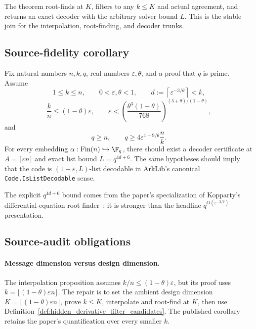 The theorem root-finds at $K$, filters to any $k\le K$ and actual agreement, and returns an exact
decoder with the arbitrary solver bound $L$.  This is the stable join for the interpolation,
root-finding, and decoder trunks.

\subsection{Source-fidelity corollary}

Fix natural numbers $n,k,q$, real numbers $\varepsilon,\theta$, and a proof that $q$ is prime.
Assume
\[
  1\le k\le n,\qquad 0<\varepsilon,\theta<1,
  \qquad d:=\left\lceil\varepsilon^{-3/\theta}\right\rceil<k,
\]
\[
  \frac{k}{n}\le(1-\theta)\varepsilon,
  \qquad
  \varepsilon<
    \left(\frac{\theta^3(1-\theta)}{768}\right)^{(5+\theta)/(1-\theta)},
\]
and
\[
  q\ge n,
  \qquad
  q\ge 4\varepsilon^{1-9/\theta}\frac{n}{k}.
\]
For every embedding $\alpha:\operatorname{Fin}(n)\hookrightarrow\F_q$, there should exist a
decoder certificate at $A=\lceil\varepsilon n\rceil$ and exact list bound $L=q^{4d+6}$.  The same
hypotheses should imply that the code is $(1-\varepsilon,L)$-list decodable in ArkLib's canonical
\texttt{Code.IsListDecodable} sense.

\begin{theorem}
  \label{thm:low_rate_rs_list_decoding}
  \notready
\end{theorem}

The explicit $q^{4d+6}$ bound comes from the paper's specialization of Kopparty's
differential-equation root finder~\cite[Theorem~4.3]{Kop15}; it is stronger than the headline
$q^{O(\varepsilon^{-3/\theta})}$ presentation.

\subsection{Source-audit obligations}

\paragraph{Message dimension versus design dimension.}
The interpolation proposition assumes $k/n\le(1-\theta)\varepsilon$, but its proof uses
$k=\lfloor(1-\theta)\varepsilon n\rfloor$.  The repair is to set the ambient design dimension
$K=\lfloor(1-\theta)\varepsilon n\rfloor$, prove $k\le K$, interpolate and root-find at $K$, then
use Definition~\ref{def:hidden_derivative_filter_candidates}.  The published corollary retains the
paper's quantification over every smaller $k$.

